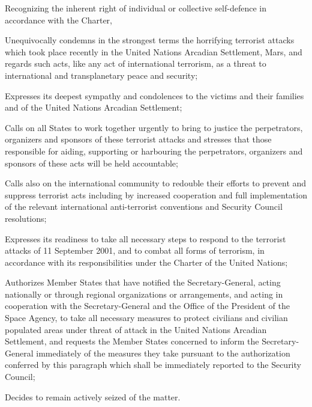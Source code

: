 Recognizing the inherent right of individual or collective self-defence in accordance with the Charter,

\startitemize[n]
\setupwhitespace[big]
\item Unequivocally condemns in the strongest terms the horrifying terrorist attacks which took place recently in the United Nations Arcadian Settlement, Mars, and regards such acts, like any act of international terrorism, as a threat to international and transplanetary peace and security;

\item Expresses its deepest sympathy and condolences to the victims and their families and of the United Nations Arcadian Settlement;

\item Calls on all States to work together urgently to bring to justice the perpetrators, organizers and sponsors of these terrorist attacks and stresses that those responsible for aiding, supporting or harbouring the perpetrators, organizers and sponsors of these acts will be held accountable;

\item Calls also on the international community to redouble their efforts to prevent and suppress terrorist acts including by increased cooperation and full implementation of the relevant international anti-terrorist conventions and Security Council resolutions;

\item Expresses its readiness to take all necessary steps to respond to the terrorist attacks of 11 September 2001, and to combat all forms of terrorism, in accordance with its responsibilities under the Charter of the United Nations;

\item Authorizes Member States that have notified the Secretary-General, acting nationally or through regional organizations or arrangements, and acting in cooperation with the Secretary-General and the Office of the President of the Space Agency, to take all necessary measures to protect civilians and civilian populated areas under threat of attack in the United Nations Arcadian Settlement, and requests the Member States concerned to inform the Secretary-General immediately of the measures they take pursuant to the authorization conferred by this paragraph which shall be immediately reported to the Security Council;

\item Decides to remain actively seized of the matter.
\stopitemize
\stopTimelineDocument

